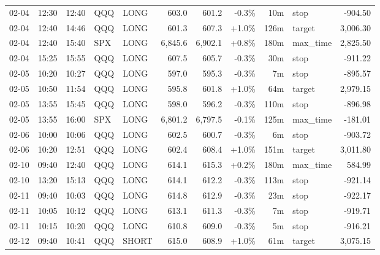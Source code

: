 \documentclass[11pt,a4paper,twoside]{article}
\begin{document}
\begin{center}
\begin{longtable}{>{\color{txtmain}}l l l l l r r r r >{\color{txtmain}}l r}
02-04 & 12:30 & 12:40 & QQQ & LONG & 603.0 & 601.2 & \textcolor{lossred}{-0.3\%} & 10m & stop & \textcolor{lossred}{-904.50} \\
02-04 & 12:40 & 14:46 & QQQ & LONG & 601.3 & 607.3 & \textcolor{wingreen}{+1.0\%} & 126m & target & \textcolor{wingreen}{3,006.30} \\
02-04 & 12:40 & 15:40 & SPX & LONG & 6,845.6 & 6,902.1 & \textcolor{wingreen}{+0.8\%} & 180m & max\_time & \textcolor{wingreen}{2,825.50} \\
02-04 & 15:25 & 15:55 & QQQ & LONG & 607.5 & 605.7 & \textcolor{lossred}{-0.3\%} & 30m & stop & \textcolor{lossred}{-911.22} \\
02-05 & 10:20 & 10:27 & QQQ & LONG & 597.0 & 595.3 & \textcolor{lossred}{-0.3\%} & 7m & stop & \textcolor{lossred}{-895.57} \\
02-05 & 10:50 & 11:54 & QQQ & LONG & 595.8 & 601.8 & \textcolor{wingreen}{+1.0\%} & 64m & target & \textcolor{wingreen}{2,979.15} \\
02-05 & 13:55 & 15:45 & QQQ & LONG & 598.0 & 596.2 & \textcolor{lossred}{-0.3\%} & 110m & stop & \textcolor{lossred}{-896.98} \\
02-05 & 13:55 & 16:00 & SPX & LONG & 6,801.2 & 6,797.5 & \textcolor{lossred}{-0.1\%} & 125m & max\_time & \textcolor{lossred}{-181.01} \\
02-06 & 10:00 & 10:06 & QQQ & LONG & 602.5 & 600.7 & \textcolor{lossred}{-0.3\%} & 6m & stop & \textcolor{lossred}{-903.72} \\
02-06 & 10:20 & 12:51 & QQQ & LONG & 602.4 & 608.4 & \textcolor{wingreen}{+1.0\%} & 151m & target & \textcolor{wingreen}{3,011.80} \\
02-10 & 09:40 & 12:40 & QQQ & LONG & 614.1 & 615.3 & \textcolor{wingreen}{+0.2\%} & 180m & max\_time & \textcolor{wingreen}{584.99} \\
02-10 & 13:20 & 15:13 & QQQ & LONG & 614.1 & 612.2 & \textcolor{lossred}{-0.3\%} & 113m & stop & \textcolor{lossred}{-921.14} \\
02-11 & 09:40 & 10:03 & QQQ & LONG & 614.8 & 612.9 & \textcolor{lossred}{-0.3\%} & 23m & stop & \textcolor{lossred}{-922.17} \\
02-11 & 10:05 & 10:12 & QQQ & LONG & 613.1 & 611.3 & \textcolor{lossred}{-0.3\%} & 7m & stop & \textcolor{lossred}{-919.71} \\
02-11 & 10:15 & 10:20 & QQQ & LONG & 610.8 & 609.0 & \textcolor{lossred}{-0.3\%} & 5m & stop & \textcolor{lossred}{-916.21} \\
02-12 & 09:40 & 10:41 & QQQ & SHORT & 615.0 & 608.9 & \textcolor{wingreen}{+1.0\%} & 61m & target & \textcolor{wingreen}{3,075.15} \\

\end{longtable}
\end{center}
\end{document}
